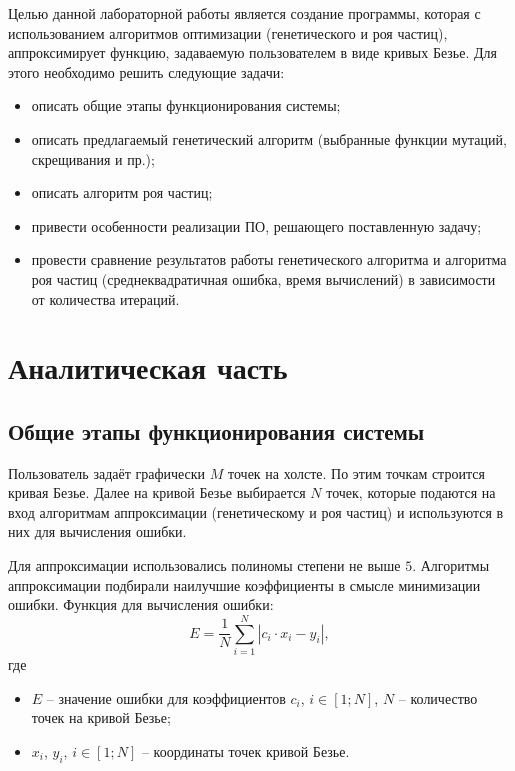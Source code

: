 \documentclass[12pt]{report}
\begin{document}
Целью данной лабораторной работы является создание программы, которая с использованием алгоритмов оптимизации (генетического и роя частиц), аппроксимирует функцию, задаваемую пользователем в виде кривых Безье.
Для этого необходимо решить следующие задачи:
\begin{itemize}
    \item описать общие этапы функционирования системы;
    \item описать предлагаемый генетический алгоритм (выбранные функции мутаций, скрещивания и пр.);
    \item описать алгоритм роя частиц;
    \item привести особенности реализации ПО, решающего поставленную задачу;
    \item провести сравнение результатов работы генетического алгоритма и алгоритма роя частиц (среднеквадратичная ошибка, время вычислений) в зависимости от количества итераций.
\end{itemize}

\chapter{Аналитическая часть}

\section{Общие этапы функционирования системы} 
\label{common-func}

Пользователь задаёт графически $M$ точек на холсте. По этим точкам строится кривая Безье. Далее на кривой Безье выбирается $N$ точек, которые подаются на вход алгоритмам аппроксимации (генетическому и роя частиц) и используются в них для вычисления ошибки.

Для аппроксимации использовались полиномы степени не выше $5$. Алгоритмы аппроксимации подбирали наилучшие коэффициенты в смысле минимизации ошибки. Функция для вычисления ошибки:
\begin{equation}
    E = \frac{1}{N}\sum_{i=1} ^{N} |c_i \cdot x_i - y_i|,
\end{equation}
где
\begin{itemize}
    \item $E$ -- значение ошибки для коэффициентов $c_i$, $i \in [1;N]$, $N$ -- количество точек на кривой Безье;
    \item $x_i$, $y_i$, $i \in [1;N]$ -- координаты точек кривой Безье.
\end{itemize}
\end{document}
